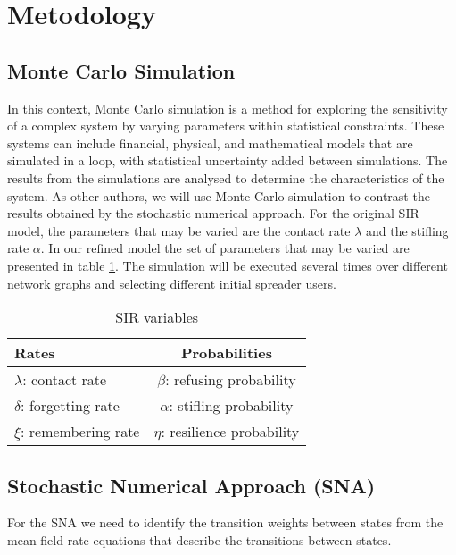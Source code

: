 \section{Metodology}

\subsection{Monte Carlo Simulation}

In this context, Monte Carlo simulation is a method for exploring the sensitivity of a complex system by varying parameters within statistical constraints. These systems can include financial, physical, and mathematical models that are simulated in a loop, with statistical uncertainty added between simulations. The results from the simulations are analysed to determine the characteristics of the system. As other authors, we will use Monte Carlo simulation to contrast the results obtained by the stochastic numerical approach. For the original SIR model, the parameters that may be varied are the contact rate $\lambda$ and the stifling rate $\alpha$. In our refined model the set of parameters that may be varied are presented in table \ref{tbl:SIR_variables}. The simulation will be executed several times over different network graphs and selecting different initial spreader users. 

\begin{table}[h]
\begin{center}
\begin{tabular}{ l | c }
  Rates & Probabilities \\
  \hline      
  $\lambda$: contact rate & $\beta$: refusing probability\\
  $\delta$: forgetting rate & $\alpha$: stifling probability\\
  $\xi$: remembering rate & $\eta$: resilience probability\\
  \hline  
\end{tabular}
\end{center}
\caption{SIR variables}
\label{tbl:SIR_variables}
\end{table}


\subsection{Stochastic Numerical Approach (SNA)}
\label{sec:actual_work}

For the SNA we need to identify the transition weights between states from the mean-field rate equations that describe the transitions between states.

